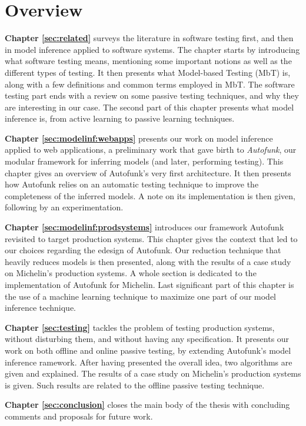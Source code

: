 
\section{Overview}
\label{sec:intro:overview}

\textbf{Chapter \ref{sec:related}} surveys the literature in
software testing first, and then in model inference applied to
software systems. The chapter starts by introducing what software
testing means, mentioning some important notions as well as the
different types of testing. It then presents what Model-based
Testing (MbT) is, along with a few definitions and common terms
employed in MbT. The software testing part ends with a review on
some passive testing techniques, and why they are interesting in
our case. The second part of this chapter presents what model
inference is, from active learning to passive learning
techniques.

\textbf{Chapter \ref{sec:modelinf:webapps}} presents our work on
model inference applied to web applications, a preliminary work
that gave birth to \textit{Autofunk}, our modular framework for
inferring models (and later, performing testing). This chapter
gives an overview of Autofunk's very first architecture. It then
presents how Autofunk relies on an automatic testing technique to
improve the completeness of the inferred models. A note on its
implementation is then given, following by an experimentation.


\textbf{Chapter \ref{sec:modelinf:prodsystems}} introduces our
framework Autofunk revisited to target production systems. This
chapter gives the context that led to our choices regarding the
edesign of Autofunk. Our reduction technique that heavily reduces
models is then presented, along with the results of a case study
on Michelin's production systems. A whole section is dedicated to
the implementation of Autofunk for Michelin. Last significant
part of this chapter is the use of a machine learning technique
to maximize one part of our model inference technique.

\textbf{Chapter \ref{sec:testing}} tackles the problem of testing
production systems, without disturbing them, and without having
any specification. It presents our work on both offline and
online passive testing, by extending Autofunk's model inference
ramework. After having presented the overall idea, two algorithms
are given and explained. The results of a case study on
Michelin's production systems is given. Such results are related
to the offline passive testing technique.

\textbf{Chapter \ref{sec:conclusion}} closes the main body of the
thesis with concluding comments and proposals for future work.

\cleardoublepage
\blankpage
